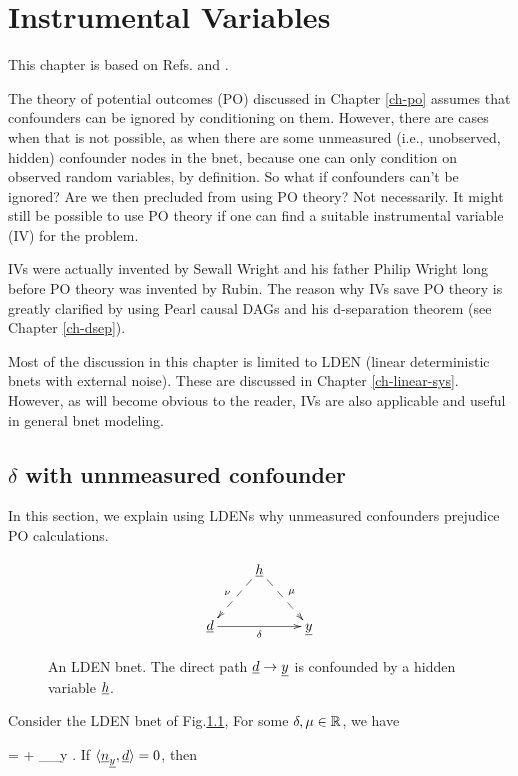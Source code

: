 \chapter{Instrumental Variables}
\label{ch-instrumental}


This chapter is based on
Refs.\cite{book-mixtape} and \cite{wiki-inst-vars}.

The theory of potential outcomes (PO)
discussed in Chapter \ref{ch-po}
assumes that confounders can be ignored
by conditioning on them.
However, there are cases when
that is not possible, as when there are some
unmeasured (i.e., unobserved, hidden)
confounder nodes in the bnet,
because one can
only condition on observed random 
variables, by definition.
So what if confounders can't be ignored?
Are we then precluded from using PO theory?
Not necessarily.
It might still be possible to
use PO theory if one can find a suitable
instrumental variable (IV) for the problem.

IVs were actually invented 
by Sewall Wright and his father Philip
Wright long before
PO theory was invented  by Rubin.
The reason why IVs save PO theory
is greatly clarified by using
Pearl causal DAGs and his d-separation theorem 
(see Chapter \ref{ch-dsep}).

Most of the discussion in this chapter
is  limited to LDEN (linear deterministic
bnets with external noise). These
are discussed in Chapter \ref{ch-linear-sys}.
However, as will become
obvious to the reader, IVs are 
also applicable
and useful
in general bnet modeling.



\section*{$\delta$ with unnmeasured confounder}

In this section,
we explain using LDENs 
why
unmeasured confounders 
prejudice PO calculations.

\begin{figure}[h!]
$$
\xymatrix{
&\rvh\ar@{-->}[dl]_\nu\ar@{-->}[dr]^\mu
\\
\rvd\ar[rr]_\delta&&\rvy
}$$
\caption{An LDEN bnet. The direct path ${\underline{d}}\rightarrow{\underline{y}}$
is confounded by
a hidden variable ${\underline{h}}$.
} 
\label{fig-iv-G-start}
\end{figure}

Consider 
the LDEN bnet of Fig.\ref{fig-iv-G-start},
For some $\delta, \mu\in { \mathbb{R}}$, we have

\beq
\rvy = \delta \rvd +
\underbrace{ \mu \rvh + \rvu_\rvy}_{\rvn_y}
\;.
\eeq
If $\langle{\underline{n}}_{\underline{y}}, {\underline{d}}\rangle=0$, then

